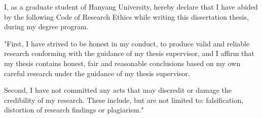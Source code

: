 
        \doublespacing
I, as a graduate student of Hanyang University, hereby declare that I have abided by the following Code of Research Ethics while writing this dissertation thesis, during my degree program.

"First, I have strived to be honest in my conduct, to produce valid and reliable research conforming with the guidance of my thesis supervisor, and I affirm that my thesis contains honest, fair and reasonable conclusions based on my own careful research under the guidance of my thesis supervisor.

Second, I have not committed any acts that may discredit or damage the credibility of my research. These include, but are not limited to: falsification, distortion of research findings or plagiarism."

